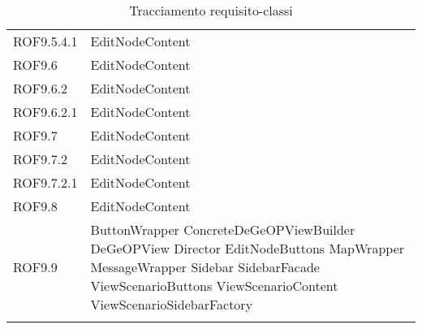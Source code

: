 \begin{longtable}{p{2.5cm}!{\VRule[1pt]}p{5cm}}
		ROF9.5.4.1 & EditNodeContent\\
		ROF9.6 & EditNodeContent\\
		ROF9.6.2 & EditNodeContent\\
		ROF9.6.2.1 & EditNodeContent\\
		ROF9.7 & EditNodeContent\\
		ROF9.7.2 & EditNodeContent\\
		ROF9.7.2.1 & EditNodeContent\\
		ROF9.8 & EditNodeContent\\
		ROF9.9 & ButtonWrapper \newline ConcreteDeGeOPViewBuilder \newline DeGeOPView \newline Director \newline EditNodeButtons \newline MapWrapper \newline MessageWrapper \newline Sidebar \newline SidebarFacade \newline ViewScenarioButtons \newline ViewScenarioContent \newline ViewScenarioSidebarFactory\\
		\caption{Tracciamento requisito-classi}
	\end{longtable}
	
	
	